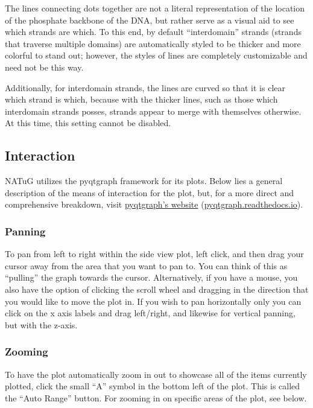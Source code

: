\documentclass[titlepage]{article}
\begin{document}
The lines connecting dots together are not a literal representation of the location of the phosphate backbone of the DNA, but rather serve as a visual aid to see which strands are which. To this end, by default ``interdomain'' strands (strands that traverse multiple domains) are automatically styled to be thicker and more colorful to stand out; however, the styles of lines are completely customizable and need not be this way.

Additionally, for interdomain strands, the lines are curved so that it is clear which strand is which, because with the thicker lines, such as those which interdomain strands posses, strands appear to merge with themselves otherwise. At this time, this setting cannot be disabled.

\subsection{Interaction} \label{sect:plot-interaction}
NATuG utilizes the pyqtgraph framework for its plots. Below lies a general description of the means of interaction for the plot, but, for a more direct and comprehensive breakdown, visit \href{https://pyqtgraph.readthedocs.io/en/latest/user_guide/mouse_interaction.html}{pyqtgraph’s website} (\href{https://pyqtgraph.readthedocs.io/en/latest/user_guide/mouse_interaction.html}{pyqtgraph.readthedocs.io}).

\subsubsection{Panning}
To pan from left to right within the side view plot, left click, and then drag your cursor away from the area that you want to pan to. You can think of this as ``pulling'' the graph towards the cursor. Alternatively, if you have a mouse, you also have the option of clicking the scroll wheel and dragging in the direction that you would like to move the plot in. If you wish to pan horizontally only you can click on the x axis labels and drag left/right, and likewise for vertical panning, but with the z-axis.

\subsubsection{Zooming}

To have the plot automatically zoom in out to showcase all of the items currently plotted, click the small ``A'' symbol in the bottom left of the plot. This is called the ``Auto Range'' button. For zooming in on specific areas of the plot, see below.
\end{document}
